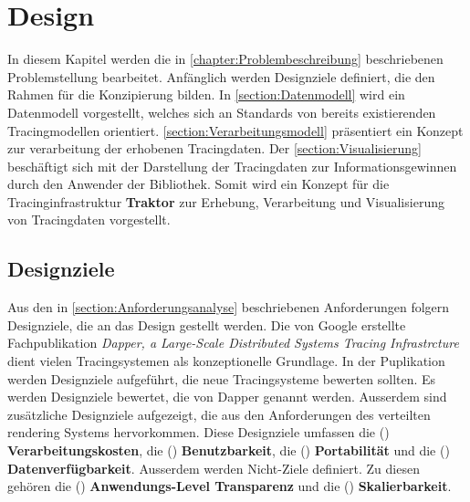 %

\chapter{Design}
\label{chapter:Design}
In diesem Kapitel werden die in \cref{chapter:Problembeschreibung} beschriebenen Problemstellung bearbeitet. Anfänglich werden Designziele definiert, die den Rahmen für die Konzipierung bilden. In \cref{section:Datenmodell} wird ein Datenmodell vorgestellt, welches sich an Standards von bereits existierenden Tracingmodellen orientiert. \cref{section:Verarbeitungsmodell} präsentiert ein Konzept zur verarbeitung der erhobenen Tracingdaten. Der \cref{section:Visualisierung} beschäftigt sich mit der Darstellung der Tracingdaten zur Informationsgewinnen durch den Anwender der Bibliothek. Somit wird ein Konzept für die Tracinginfrastruktur \textbf{Traktor }zur Erhebung, Verarbeitung und Visualisierung von Tracingdaten vorgestellt.

\section{Designziele}
\label{section:Designziele}

Aus den in \cref{section:Anforderungsanalyse} beschriebenen Anforderungen folgern Designziele, die an das Design gestellt werden. Die von Google erstellte Fachpublikation \emph{Dapper, a Large-Scale Distributed Systems Tracing Infrastrcture} dient vielen Tracingsystemen als konzeptionelle Grundlage. In der Puplikation werden Designziele aufgeführt, die neue Tracingsysteme bewerten sollten. Es werden Designziele bewertet, die von Dapper genannt werden. Ausserdem sind zusätzliche Designziele aufgezeigt, die aus den Anforderungen des verteilten rendering Systems hervorkommen. Diese Designziele umfassen die () \textbf{Verarbeitungskosten}, die () \textbf{Benutzbarkeit}, die () \textbf{Portabilität} und die () \textbf{Datenverfügbarkeit}. Ausserdem werden Nicht-Ziele definiert. Zu diesen gehören die () \textbf{Anwendungs-Level Transparenz} und die () \textbf{Skalierbarkeit}.


